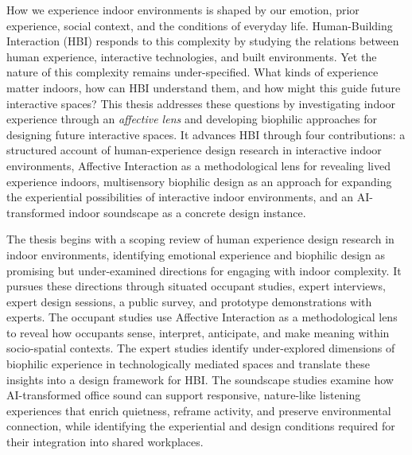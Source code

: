 \cleardoublepage
{}

How we experience indoor environments is shaped by our emotion, prior experience, social context, and the conditions of everyday life. Human-Building Interaction (HBI) responds to this complexity by studying the relations between human experience, interactive technologies, and built environments. Yet the nature of this complexity remains under-specified. What kinds of experience matter indoors, how can HBI understand them, and how might this guide future interactive spaces? This thesis addresses these questions by investigating indoor experience through an \emph{affective lens} and developing biophilic approaches for designing future interactive spaces. It advances HBI through four contributions: a structured account of human-experience design research in interactive indoor environments, Affective Interaction as a methodological lens for revealing lived experience indoors, multisensory biophilic design as an approach for expanding the experiential possibilities of interactive indoor environments, and an AI-transformed indoor soundscape as a concrete design instance.

The thesis begins with a scoping review of human experience design research in indoor environments, identifying emotional experience and biophilic design as promising but under-examined directions for engaging with indoor complexity. It pursues these directions through situated occupant studies, expert interviews, expert design sessions, a public survey, and prototype demonstrations with experts. The occupant studies use Affective Interaction as a methodological lens to reveal how occupants sense, interpret, anticipate, and make meaning within socio-spatial contexts. The expert studies identify under-explored dimensions of biophilic experience in technologically mediated spaces and translate these insights into a design framework for HBI. The soundscape studies examine how AI-transformed office sound can support responsive, nature-like listening experiences that enrich quietness, reframe activity, and preserve environmental connection, while identifying the experiential and design conditions required for their integration into shared workplaces.





